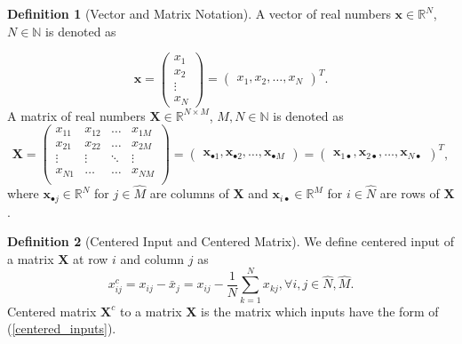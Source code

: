 \documentclass[11pt,oneside,czech,american]{book} %
\theoremstyle{plain}
\theoremstyle{definition}
\newtheorem{defn}{Definition}
\begin{document}
\begin{defn}[Vector and Matrix Notation]
	A vector of real numbers $\bm{x} \in \mathbb{R}^N$, $N \in \mathbb{N}$ is denoted as
	
	\begin{equation}
		\bm{x}=\begin{pmatrix}
			x_1 \\
			x_2 \\
			\vdots \\
			x_N
			
			
		\end{pmatrix} = \begin{pmatrix}
			x_1, x_2, \dots, x_N
		\end{pmatrix}^T.
	\end{equation}
	A matrix of real numbers $\bm{X} \in \mathbb{R}^{N\times M}$, $M,N \in \mathbb{N}$ is denoted as
	\begin{equation}
		\bm{X}=\begin{pmatrix}
			x_{11} & x_{12} & \dots & x_{1M}\\
			x_{21} & x_{22} & \dots & x_{2M}\\
			\vdots & \vdots & \ddots & \vdots\\
			x_{N1} & \dots & \dots & x_{NM} \\
			
			
		\end{pmatrix} = \begin{pmatrix}
			\bm{x}_{\bullet 1}, \bm{x}_{\bullet 2}, \dots, \bm{x}_{\bullet M}
		\end{pmatrix} = \begin{pmatrix}
			\bm{x}_{1 \bullet}, \bm{x}_{2 \bullet}, \dots, \bm{x}_{N \bullet}
		\end{pmatrix}^T,
	\end{equation}
	where $\bm{x}_{\bullet j} \in \mathbb{R}^{N}$ for $j \in \hat{M}$ are columns of $\bm{X}$ and $\bm{x}_{ i \bullet} \in \mathbb{R}^{M}$ for $i \in \hat{N}$ are rows of $\bm{X}$.
	
\end{defn}

\begin{defn}[Centered Input and Centered Matrix]
	We define centered input of a matrix $\bm{X}$ at row $i$ and column $j$ as
	\begin{equation}
		x^{c}_{ij} = x_{ij} - \bar{x}_j = x_{ij} - \frac{1}{N} \sum_{k=1}^{N} x_{kj}, \forall i,j \in \hat{N}, \hat{M}.
		\label{centered_inputs}
	\end{equation}
	Centered matrix $\bm{X}^c$ to a matrix $\bm{X}$ is the matrix which inputs have the form of (\ref{centered_inputs}).
\end{defn}
\end{document}
